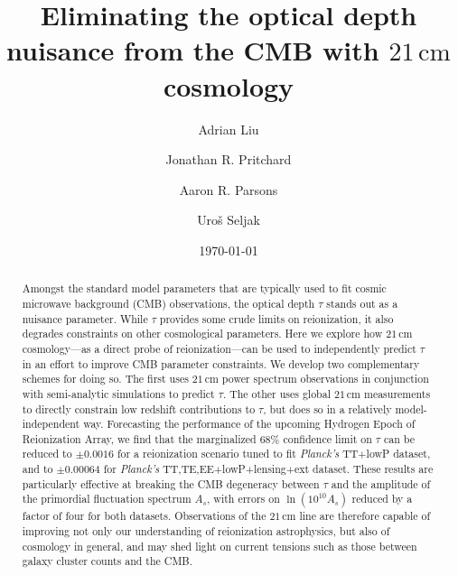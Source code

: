 \documentclass[twocolumn,aps,prd,nofootinbib,showpacs]{revtex4-1}
\begin{document}
\title{Eliminating the optical depth nuisance from the CMB with $21\,\textrm{cm}$ cosmology}


\author{Adrian Liu}

\author{Jonathan R. Pritchard}

\author{Aaron R. Parsons}

\author{Uro\v{s} Seljak}

\date{\today}





\begin{abstract}
Amongst the standard model parameters that are typically used to fit cosmic microwave background (CMB) observations, the optical depth $\tau$ stands out as a nuisance parameter. While $\tau$ provides some crude limits on reionization, it also degrades constraints on other cosmological parameters. Here we explore how $21\,\textrm{cm}$ cosmology---as a direct probe of reionization---can be used to independently predict $\tau$ in an effort to improve CMB parameter constraints. We develop two complementary schemes for doing so. The first uses $21\,\textrm{cm}$ power spectrum observations in conjunction with semi-analytic simulations to predict $\tau$. The other uses global $21\,\textrm{cm}$ measurements to directly constrain low redshift contributions to $\tau$, but does so in a relatively model-independent way. Forecasting the performance of the upcoming Hydrogen Epoch of Reionization Array, we find that the marginalized $68\%$ confidence limit on $\tau$ can be reduced to $\pm 0.0016$ for a reionization scenario tuned to fit \emph{Planck's} TT+lowP dataset, and to $\pm 0.00064$ for \emph{Planck's} TT,TE,EE+lowP+lensing+ext dataset. These results are particularly effective at breaking the CMB degeneracy between $\tau$ and the amplitude of the primordial fluctuation spectrum $A_s$, with errors on $\ln (10^{10} A_s)$ reduced by a factor of four for both datasets. Observations of the $21\,\textrm{cm}$ line are therefore capable of improving not only our understanding of reionization astrophysics, but also of cosmology in general, and may shed light on current tensions such as those between galaxy cluster counts and the CMB.
\end{abstract}
\end{document}
